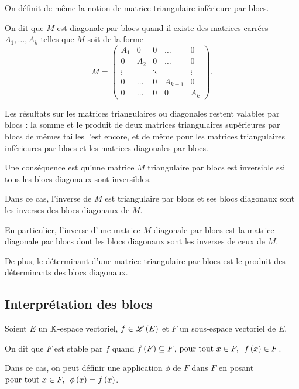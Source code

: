On définit de même la notion de matrice triangulaire inférieure par blocs.

\begin{defi}
On dit que \(M\) est diagonale par blocs quand il existe des matrices carrées \(A_1,\dots,A_k\) telles que \(M\) soit de la forme \[M=\begin{pmatrix}
A_1 & 0 & 0 & \dots & 0 \\
0 & A_2 & 0 & \dots & 0 \\
\vdots &  & \ddots &  & \vdots \\
0 & \dots & 0 & A_{k-1} & 0 \\
0 & \dots & 0 & 0 & A_k
\end{pmatrix}.\]
\end{defi}

Les résultats sur les matrices triangulaires ou diagonales restent valables par blocs : la somme et le produit de deux matrices triangulaires supérieures par blocs de mêmes tailles l'est encore, et de même pour les matrices triangulaires inférieures par blocs et les matrices diagonales par blocs.

Une conséquence est qu'une matrice \(M\) triangulaire par blocs est inversible ssi tous les blocs diagonaux sont inversibles.

Dans ce cas, l'inverse de \(M\) est triangulaire par blocs et ses blocs diagonaux sont les inverses des blocs diagonaux de \(M\).

En particulier, l'inverse d'une matrice \(M\) diagonale par blocs est la matrice diagonale par blocs dont les blocs diagonaux sont les inverses de ceux de \(M\).

De plus, le déterminant d'une matrice triangulaire par blocs est le produit des déterminants des blocs diagonaux.

\subsection{Interprétation des blocs}

\begin{defi}
Soient \(E\) un \(\mathbb{K}\)-espace vectoriel, \(f\in\mathscr{L}\left(E\right)\) et \(F\) un sous-espace vectoriel de \(E\).

On dit que \(F\) est stable par \(f\) quand \(f\left(F\right)\subseteq F\), \ie \(\quantifs{\tpt x\in F}f\paren{x}\in F\).
\end{defi}

Dans ce cas, on peut définir une application \(\phi\) de \(F\) dans \(F\) en posant \(\quantifs{\tpt x\in F}\phi\paren{x}=f\paren{x}\).

